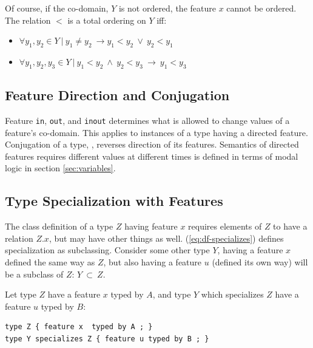 Of course, if the co-domain, $Y$ is not ordered, the feature $x$ cannot be ordered.  The relation $<$ is a total ordering on $Y$ iff:
\begin{itemize}
\item $\forall y_1, y_2 \in Y~\vert~y_1\ne y_2~\rightarrow y_1<y_2~\vee~y_2<y_1$
\item $\forall y_1, y_2, y_3 \in Y~\vert~y_1<y_2~\wedge~y_2<y_3~\rightarrow~y_1<y_3$
\end{itemize}

\subsection{Feature Direction and Conjugation}\label{sec:direction}

\pn Feature  \texttt{in}, \texttt{out}, and \texttt{inout} determines what is allowed to change values of a feature's co-domain.  This applies to instances of a type having a directed feature.  Conjugation of a type, \texttt{\midtilde}, reverses direction of its features.
Semantics of directed features requires different values at different times is defined in terms of modal logic in section \ref{sec:variables}.

\subsection{Type Specialization with Features} 

\pn  The class definition of a type $Z$ having feature $x$ requires elements of $Z$ to have a relation $Z.x$, but may have other things as well.
(\ref{eq:df-specializes}) defines specialization as subclassing.  Consider some other type $Y$, having a feature $x$ defined the same way as $Z$, but also having a feature $u$ (defined its own way) will be a subclass of $Z$:  $Y~\subset~Z$.

\pn Let type $Z$ have a feature $x$ typed by $A$, and type $Y$ which specializes $Z$ have a feature $u$ typed by $B$:

\begin{lstlisting}
type Z { feature x  typed by A ; }
type Y specializes Z { feature u typed by B ; }
\end{lstlisting}

